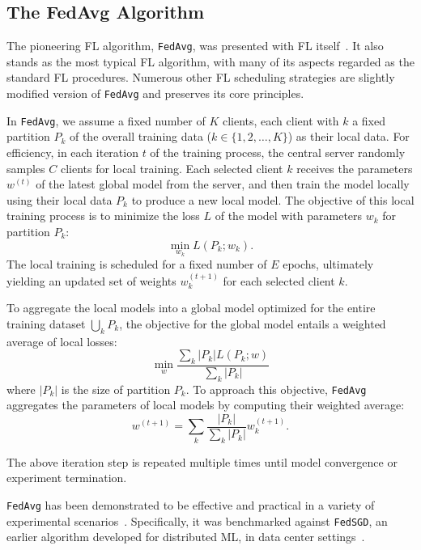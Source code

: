 \documentclass[conference]{IEEEtran}
\begin{document}
\subsection{The FedAvg Algorithm}

The pioneering FL algorithm, \verb|FedAvg|,
was presented with FL itself~\cite{mcmahan2017communication}.
It also stands as the most typical FL algorithm,
with many of its aspects regarded as the standard FL procedures.
Numerous other FL scheduling strategies are slightly modified version of
\verb|FedAvg| and preserves its core principles.

In \verb|FedAvg|,
we assume a fixed number of $K$ clients,
each client with $k$ a fixed partition $P_k$ of
the overall training data ($k \in \{1, 2, \dots, K\}$) as their local data.
For efficiency,
in each iteration $t$ of the training process,
the central server randomly samples $C$ clients for local training.
Each selected client $k$ receives the parameters $w^{(t)}$ of
the latest global model from the server,
and then train the model locally using their local data $P_k$
to produce a new local model.
The objective of this local training process is to minimize the loss $L$ of
the model with parameters $w_k$ for partition $P_k$:
\begin{equation}
    \min_{w_k} L(P_k;w_k).
\end{equation}
The local training is scheduled for a fixed number of $E$ epochs,
ultimately yielding an updated set of weights $w_k^{(t+1)}$ for
each selected client $k$.

To aggregate the local models into a global model
optimized for the entire training dataset $\bigcup_k P_k$,
the objective for the global model entails
a weighted average of local losses:
\begin{equation}
    \min_{w} \frac{\sum_k |P_k|L(P_k;w)}{\sum_k |P_k|}
\end{equation}
where $|P_k|$ is the size of partition $P_k$.
To approach this objective,
\verb|FedAvg| aggregates the parameters of local models by
computing their weighted average:
\begin{equation}
    w^{(t+1)}=\sum_k \frac{|P_k|}{\sum_k |P_k|}w_k^{(t+1)}.
\end{equation}

The above iteration step is repeated multiple times until
model convergence or experiment termination.

\verb|FedAvg| has been demonstrated to be effective and practical
in a variety of experimental scenarios~\cite{mcmahan2017communication}.
Specifically, it was benchmarked against \verb|FedSGD|\cite{chen2016revisiting},
an earlier algorithm developed for distributed ML,
in data center settings~\cite{bonawitz2019towards}.
\end{document}
